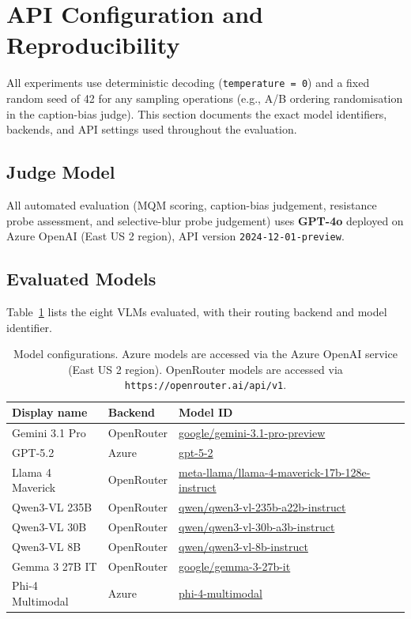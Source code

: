 \section{API Configuration and Reproducibility}
\label{sec:appendix-reproducibility}

All experiments use deterministic decoding (\texttt{temperature\,=\,0}) and a fixed random seed of 42 for any sampling operations (e.g., A/B ordering randomisation in the caption-bias judge). This section documents the exact model identifiers, backends, and API settings used throughout the evaluation.

\subsection{Judge Model}

All automated evaluation (MQM scoring, caption-bias judgement, resistance probe assessment, and selective-blur probe judgement) uses \textbf{GPT-4o} deployed on Azure OpenAI (East US 2 region), API version \texttt{2024-12-01-preview}.

\subsection{Evaluated Models}

Table~\ref{tab:model-config} lists the eight VLMs evaluated, with their routing backend and model identifier.

\begin{table}[h!]
\centering
\footnotesize
\setlength{\tabcolsep}{4pt}
\begin{tabular}{@{}p{}p{}p{}@{}}
\toprule
\textbf{Display name} & \textbf{Backend} & \textbf{Model ID} \\
\midrule
Gemini 3.1 Pro     & OpenRouter & \url{google/gemini-3.1-pro-preview} \\
GPT-5.2            & Azure      & \url{gpt-5-2} \\
Llama 4 Maverick   & OpenRouter & \url{meta-llama/llama-4-maverick-17b-128e-instruct} \\
Qwen3-VL 235B      & OpenRouter & \url{qwen/qwen3-vl-235b-a22b-instruct} \\
Qwen3-VL 30B       & OpenRouter & \url{qwen/qwen3-vl-30b-a3b-instruct} \\
Qwen3-VL 8B        & OpenRouter & \url{qwen/qwen3-vl-8b-instruct} \\
Gemma 3 27B IT     & OpenRouter & \url{google/gemma-3-27b-it} \\
Phi-4 Multimodal   & Azure      & \url{phi-4-multimodal} \\
\bottomrule
\end{tabular}
\caption{Model configurations. Azure models are accessed via the Azure OpenAI service (East US 2 region). OpenRouter models are accessed via \texttt{https://openrouter.ai/api/v1}.}
\label{tab:model-config}
\end{table}

